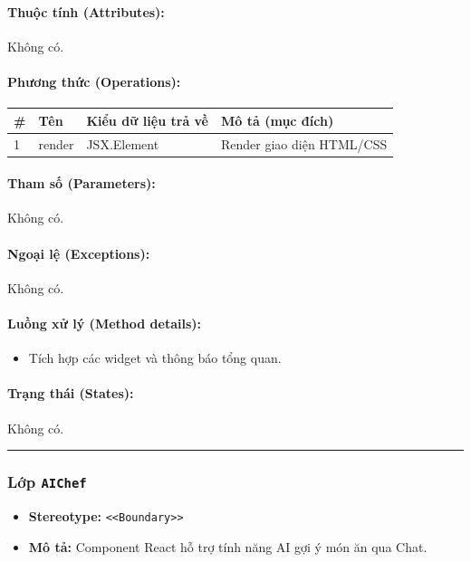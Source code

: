 \documentclass[12pt,a4paper]{article}
\begin{document}
\paragraph{Thuộc tính (Attributes):}
Không có.

\paragraph{Phương thức (Operations):}
\begin{longtable}{|p{0.6cm}|p{3.8cm}|p{2.6cm}|p{6.5cm}|}
\hline
\textbf{\#} & \textbf{Tên} & \textbf{Kiểu dữ liệu trả về} & \textbf{Mô tả (mục đích)} \\ \hline
\endhead
1 & render & JSX.Element & Render giao diện HTML/CSS \\ \hline
\end{longtable}

\paragraph{Tham số (Parameters):}
Không có.

\paragraph{Ngoại lệ (Exceptions):}
Không có.

\paragraph{Luồng xử lý (Method details):}
\begin{itemize}[leftmargin=*]
    \item Tích hợp các widget và thông báo tổng quan.
\end{itemize}


\paragraph{Trạng thái (States):}
Không có.

\vskip 0.5cm
\noindent\rule{\textwidth}{0.5pt}
\vskip 0.5cm

\subsubsection{Lớp \texttt{AIChef}}
\begin{itemize}[leftmargin=*]
    \item \textbf{Stereotype:} \texttt{\textless{}\textless{}Boundary\textgreater{}\textgreater{}}
    \item \textbf{Mô tả:} Component React hỗ trợ tính năng AI gợi ý món ăn qua Chat.
\end{itemize}
\end{document}
